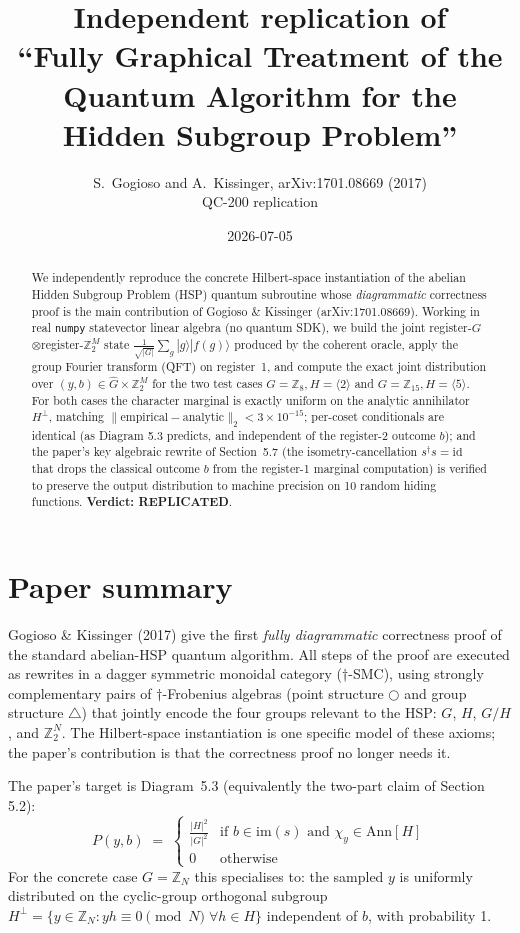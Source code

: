 \documentclass[11pt]{article}
\title{Independent replication of \\
``Fully Graphical Treatment of the Quantum Algorithm for the Hidden Subgroup Problem''}
\author{S.\ Gogioso and A.\ Kissinger, arXiv:1701.08669 (2017) \\ QC-200 replication}
\date{2026-07-05}
\begin{document}
\maketitle

\begin{abstract}
We independently reproduce the concrete Hilbert-space instantiation of the abelian Hidden Subgroup
Problem (HSP) quantum subroutine whose \emph{diagrammatic} correctness proof is the main
contribution of Gogioso \& Kissinger (arXiv:1701.08669). Working in real \texttt{numpy} statevector
linear algebra (no quantum SDK), we build the joint register-$G$$\otimes$register-$\mathbb{Z}_2^M$
state $\frac{1}{\sqrt{|G|}} \sum_g |g\rangle |f(g)\rangle$ produced by the coherent oracle,
apply the group Fourier transform (QFT) on register~1, and compute the exact joint distribution
over $(y,b) \in \widehat{G} \times \mathbb{Z}_2^M$ for the two test cases
$G=\mathbb{Z}_8, H=\langle 2\rangle$ and $G=\mathbb{Z}_{15}, H=\langle 5\rangle$.
For both cases the character marginal is exactly uniform on the analytic annihilator
$H^\perp$, matching $\|\text{empirical}-\text{analytic}\|_2 < 3\times 10^{-15}$;
per-coset conditionals are identical (as Diagram 5.3 predicts, and independent of the
register-2 outcome $b$); and the paper's key algebraic rewrite of Section~5.7
(the isometry-cancellation $s^\dagger s = \mathrm{id}$ that drops the classical outcome $b$
from the register-1 marginal computation) is verified to preserve the output distribution
to machine precision on 10 random hiding functions.
\textbf{Verdict: REPLICATED}.
\end{abstract}

\section{Paper summary}

Gogioso \& Kissinger (2017) give the first \emph{fully diagrammatic} correctness proof of the
standard abelian-HSP quantum algorithm. All steps of the proof are executed as rewrites in a
dagger symmetric monoidal category (†-SMC), using strongly complementary pairs of
$\dagger$-Frobenius algebras (point structure $\bigcirc$ and group structure $\bigtriangleup$)
that jointly encode the four groups relevant to the HSP: $G$, $H$, $G/H$, and
$\mathbb{Z}_2^N$. The Hilbert-space instantiation is one specific model of these axioms;
the paper's contribution is that the correctness proof no longer needs it.

The paper's target is Diagram~5.3 (equivalently the two-part claim of Section 5.2):
\begin{equation}
    P(y, b) \;=\;
    \begin{cases}
        \frac{|H|^2}{|G|^2} & \text{if } b \in \mathrm{im}(s) \text{ and } \chi_y \in \mathrm{Ann}[H] \\
        0                   & \text{otherwise}
    \end{cases}
\end{equation}
For the concrete case $G=\mathbb{Z}_N$ this specialises to: the sampled $y$ is uniformly
distributed on the cyclic-group orthogonal subgroup $H^\perp = \{y \in \mathbb{Z}_N : yh \equiv 0 \pmod N \; \forall h \in H\}$
independent of $b$, with probability 1.
\end{document}
